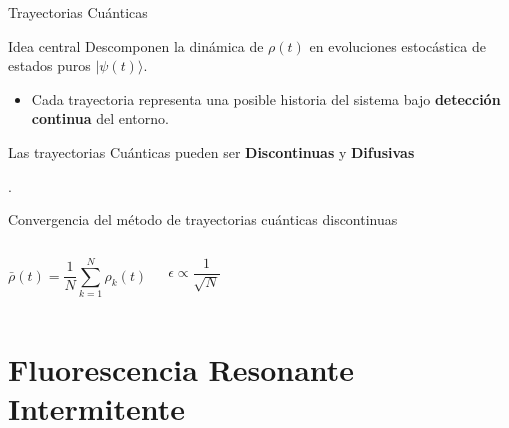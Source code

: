 \documentclass[aspectratio=169]{beamer}
\begin{document}
\begin{frame}{Trayectorias Cuánticas}
\begin{block}{Idea central}
Descomponen la dinámica de $\rho (t)$ en evoluciones estocástica de estados puros $|\psi(t)\rangle$.
\end{block}

\begin{itemize}
\item Cada trayectoria representa una posible historia del sistema bajo \textbf{detección continua} del entorno.

\end{itemize}

\vspace{0.3cm}
\begin{center}
    Las trayectorias Cuánticas pueden ser \textbf{Discontinuas} y \textbf{Difusivas}
\end{center}
.
\end{frame}
\begin{frame}{Convergencia del método de trayectorias cuánticas discontinuas}

\begin{columns}

\begin{equation}
 \bar{\rho}(t)= \frac{1}{N} \sum_{k=1}^{N} \rho_k(t)   
\end{equation}




\begin{equation}
\epsilon \propto \frac{1}{\sqrt{N}}
\end{equation}








\end{columns}

\end{frame}


\section{Fluorescencia Resonante Intermitente}
\end{document}
